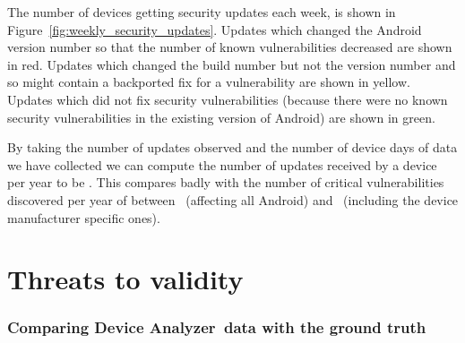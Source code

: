 \documentclass{llncs}
\newcommand{\da}{Device Analyzer}
\begin{document}
The number of devices getting security updates each week, is shown in Figure~\ref{fig:weekly_security_updates}.
Updates which changed the Android version number so that the number of known vulnerabilities decreased are shown in red.
Updates which changed the build number but not the version number and so might contain a backported fix for a vulnerability are shown in yellow.
Updates which did not fix security vulnerabilities (because there were no known security vulnerabilities in the existing version of Android) are shown in green.

By taking the number of updates observed and the number of device days of data we have collected we can compute the number of updates received by a device per year to be \daUpdatesPerYear.
This compares badly with the number of critical vulnerabilities discovered per year of between \avoVulnsPerYearAllAndroid\ (affecting all Android) and \avoVulnsPerYear\ (including the device manufacturer specific ones).





\section{Threats to validity}
\label{sec:validity}
\subsubsection{Comparing \da\ data with the ground truth}
\label{sec:representative}
\end{document}
